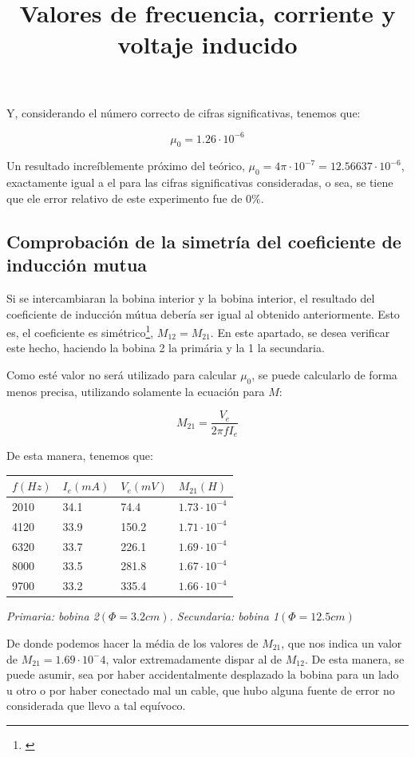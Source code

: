 \documentclass[a4paper,12pt]{article}
\begin{document}
Y, considerando el número correcto de cifras significativas, tenemos que:

\begin{tcolorbox}
    \begin{equation}
        \mu_0 = 1.26 \cdot 10^{-6}
    \end{equation}
\end{tcolorbox}

Un resultado increíblemente próximo del teórico, $\mu_0 =  4\pi \cdot 10^{-7} = 12.56637\cdot 10^{-6}$, exactamente igual a el para las cifras significativas consideradas, o sea, se tiene que ele error relativo de este experimento fue de $0\%$.
\subsection{Comprobación de la simetría del coeficiente de inducción mutua}
Si se intercambiaran la bobina interior y la bobina interior, el resultado del coeficiente de inducción mútua debería ser igual al obtenido anteriormente. Esto es, el coeficiente es simétrico\footnote{\cite[322]{Griffiths}}, $M_{12} = M_{21}$. En este apartado, se desea verificar este hecho, haciendo la bobina 2 la primária y la 1 la secundaria.

Como esté valor no será utilizado para calcular $\mu_0$, se puede calcularlo de forma menos precisa, utilizando solamente la ecuación para $M$:

$$M_{21} = \frac{V_e}{2\pi f I_e}$$

De esta manera, tenemos que:
\begin{table}[h!]
    \title{\textbf{Valores de frecuencia, corriente y voltaje inducido}}
    \centering
    \begin{tabular}{|l|l|l|l|}
    \hline
        $f(Hz)$ & $I_e (mA)$ & $V_e (mV)$ & $M_{21}(H)$ \\ \hline
        2010 & 34.1 & 74.4 & $1.73\cdot 10^{-4}$ \\ \hline
        4120 & 33.9 & 150.2 & $1.71\cdot 10^{-4}$ \\ \hline
        6320 & 33.7 & 226.1 & $1.69\cdot 10^{-4}$ \\ \hline
        8000 & 33.5 & 281.8 & $1.67\cdot 10^{-4}$ \\ \hline
        9700 & 33.2 & 335.4 & $1.66\cdot 10^{-4}$ \\ \hline
    \end{tabular}
\end{table}
\begin{center}
    \textit{Primaria: bobina 2$(\Phi = 3.2cm)$. Secundaria: bobina 1$(\Phi = 12.5cm)$}
\end{center}
De donde podemos hacer la média de los valores de $M_{21}$, que nos indica un valor de $M_{21} = 1.69 \cdot 10^-4$, valor extremadamente dispar al de $M_{12}$. De esta manera, se puede asumir, sea por haber accidentalmente desplazado la bobina para un lado u otro o por haber conectado mal un cable, que hubo alguna fuente de error no considerada que llevo a tal equívoco. 
\end{document}

